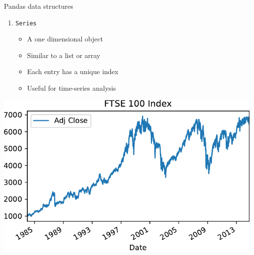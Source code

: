 \documentclass[xcolor=table]{beamer}
\begin{document}
\begin{frame}{Pandas data structures}

\begin{enumerate}
	\item \texttt{Series}
	\begin{itemize}
		\item A one dimensional object
		\item Similar to a list or array
		\item Each entry has a unique index
		\item Useful for time-series analysis
	\end{itemize}
\end{enumerate}

\begin{center}
	\includegraphics[width=.7\textwidth]{ftse1.pdf}
\end{center}

\end{frame}
\end{document}
